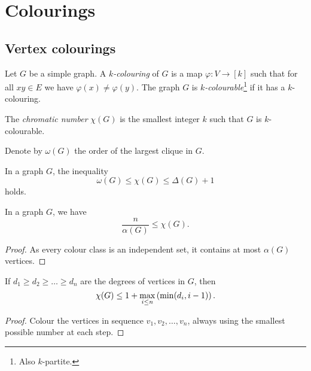 \section{Colourings}

\subsection{Vertex colourings}

\begin{definicija}
Let $G$ be a simple graph. A
\emph{$k$-colouring} of $G$ is a map
$\varphi \colon V \to [k]$ such that for all $xy \in E$ we have
$\varphi(x) \ne \varphi(y)$. The graph $G$ is
\emph{$k$-colourable}\footnote{Also $k$-partite.}
if it has a $k$-colouring.
\end{definicija}

\begin{definicija}
The \emph{chromatic number} $\chi(G)$ is
the smallest integer $k$ such that $G$ is $k$-colourable.
\end{definicija}

\begin{definicija}
Denote by $\omega(G)$ the order of the largest clique in $G$.
\end{definicija}

\begin{trditev}
In a graph $G$, the inequality
\[
\omega(G) \leq \chi(G) \leq \Delta(G) + 1
\]
holds.
\end{trditev}

\obvs

\begin{trditev}
In a graph $G$, we have
\[
\frac{n}{\alpha(G)} \leq \chi(G).
\]
\end{trditev}

\begin{proof}
As every colour class is an independent set, it contains at most
$\alpha(G)$ vertices.
\end{proof}

\begin{izrek}
If $d_1 \geq d_2 \geq \dots \geq d_n$ are the degrees of vertices
in $G$, then
\[
\chi(G) \leq 1 + \max_{i \leq n} \left(\min(d_i, i-1)\right).
\]
\end{izrek}

\begin{proof}
Colour the vertices in sequence $v_1, v_2, \dots, v_n$, always
using the smallest possible number at each step.
\end{proof}

